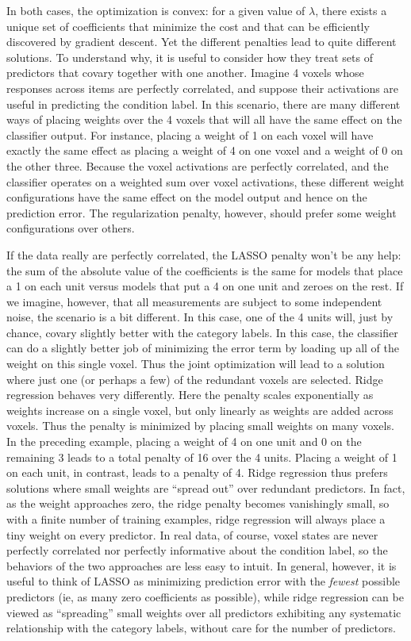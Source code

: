 In both cases, the optimization is convex: for a given value of $\lambda$, there exists a unique set of coefficients that minimize the cost and that can be efficiently discovered by gradient descent. Yet the different penalties lead to quite different solutions. To understand why, it is useful to consider how they treat sets of predictors that covary together with one another. Imagine 4 voxels whose responses across items are perfectly correlated, and suppose their activations are useful in predicting the condition label. In this scenario, there are many different ways of placing weights over the 4 voxels that will all have the same effect on the classifier output. For instance, placing a weight of 1 on each voxel will have exactly the same effect as placing a weight of 4 on one voxel and a weight of 0 on the other three. Because the voxel activations are perfectly correlated, and the classifier operates on a weighted sum over voxel activations, these different weight configurations have the same effect on the model output and hence on the prediction error. The regularization penalty, however, should prefer some weight configurations over others.

If the data really are perfectly correlated, the LASSO penalty won't be any help: the sum of the absolute value of the coefficients is the same for models that place a 1 on each unit versus models that put a 4 on one unit and zeroes on the rest. If we imagine, however, that all measurements are subject to some independent noise, the scenario is a bit different. In this case, one of the 4 units will, just by chance, covary slightly better with the category labels. In this case, the classifier can do a slightly better job of minimizing the error term by loading up all of the weight on this single voxel. Thus the joint optimization will lead to a solution where just one (or perhaps a few) of the redundant voxels are selected. Ridge regression behaves very differently. Here the penalty scales exponentially as weights increase on a single voxel, but only linearly as weights are added across voxels. Thus the penalty is minimized by placing small weights on many voxels. In the preceding example, placing a weight of 4 on one unit and 0 on the remaining 3 leads to a total penalty of 16 over the 4 units. Placing a weight of 1 on each unit, in contrast, leads to a penalty of 4. Ridge regression thus prefers solutions where small weights are ``spread out'' over redundant predictors. In fact, as the weight approaches zero, the ridge penalty becomes vanishingly small, so with a finite number of training examples, ridge regression will always place a tiny weight on every predictor. In real data, of course, voxel states are never perfectly correlated nor perfectly informative about the condition label, so the behaviors of the two approaches are less easy to intuit. In general, however, it is useful to think of LASSO as minimizing prediction error with the {\em fewest} possible predictors (ie, as many zero coefficients as possible), while ridge regression can be viewed as ``spreading'' small weights over all predictors exhibiting any systematic relationship with the category labels, without care for the number of predictors. 

